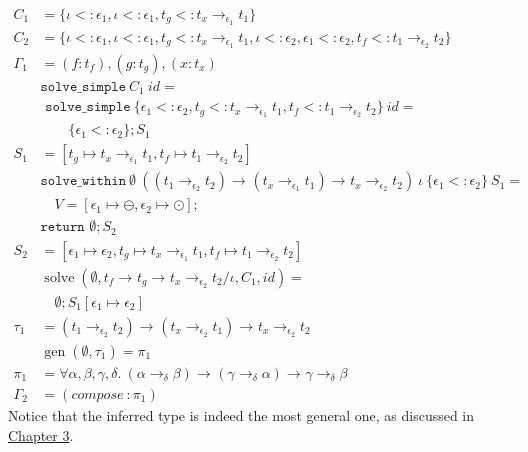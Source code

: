 \documentclass[declaration,shortabstract]{iithesis}
\theoremstyle{definition} \newtheorem{definition}{Definition}[section]
\newcommand{\arrow}[3]{{#1}\rightarrow_{#2}{#3}}
\begin{document}
\begin{align*}
C_1 & = \{\iota <: \epsilon_1, \iota <: \epsilon_1, t_g <: \arrow{t_x}{\epsilon_1}{t_1}\}
\\
C_2 & = \{
            \iota <: \epsilon_1, \iota <: \epsilon_1, t_g <: \arrow{t_x}{\epsilon_1}{t_1}, 
            \iota <: \epsilon_2, \epsilon_1 <: \epsilon_2, t_f <: \arrow{t_1}{\epsilon_2}{t_2}
        \}
\\
\Gamma_1 & = (f:t_f),(g:t_g),(x:t_x)
\\
  & \texttt{solve\_simple}\  C_1\ id = \\
  & \texttt{  solve\_simple}\ \{
            \epsilon_1 <: \epsilon_2,
           t_g <: \arrow{t_x}{\epsilon_1}{t_1}, 
           t_f <: \arrow{t_1}{\epsilon_2}{t_2}
        \}\ id = \\
  & \qquad \{\epsilon_1 <: \epsilon_2\} ; S_1\\
S_1 & = [t_g \mapsto \arrow{t_x}{\epsilon_1}{t_1}, t_f \mapsto \arrow{t_1}{\epsilon_2}{t_2}]
\\
  & \texttt{solve\_within}\ \emptyset\
    (\arrow{(\arrow{t_1}{\epsilon_2}{t_2})}{}{\arrow{(\arrow{t_x}{\epsilon_1}{t_1})}{}{\arrow{t_x}{\epsilon_2}{t_2}}})
    \ \iota \ \{\epsilon_1 <: \epsilon_2\} \ S_1 = \\
  & \quad V = [\epsilon_1 \mapsto \ominus, \epsilon_2 \mapsto \odot] ;\\
  & \texttt{return } \emptyset ; S_2
\\
S_2 & = [\epsilon_1 \mapsto \epsilon_2, t_g \mapsto \arrow{t_x}{\epsilon_1}{t_1}, t_f \mapsto \arrow{t_1}{\epsilon_2}{t_2}]
\\
& \operatorname{solve}(\emptyset, {\arrow{t_f}{}{\arrow{t_g}{}{\arrow{t_x}{\epsilon_2}{t_2}}}}/{\iota}, C_1, id) =
\\
& \quad \emptyset ; S_1[\epsilon_1 \mapsto \epsilon_2]
\\
\tau_1 & = \arrow{(\arrow{t_1}{\epsilon_2}{t_2})}{}{\arrow{(\arrow{t_x}{\epsilon_2}{t_1})}{}{\arrow{t_x}{\epsilon_2}{t_2}}} \\
& \operatorname{gen}(\emptyset, \tau_1) = \pi_1 \\
\pi_1 & =  \forall \alpha, \beta, \gamma, \delta .\ 
\arrow{(\arrow{\alpha}{\delta}{\beta})}{}{\arrow{(\arrow{\gamma}{\delta}{\alpha})}{}{\arrow{\gamma}{\delta}{\beta}
}}\\
\Gamma_2 & = (compose\ : \pi_1) 
\end{align*}
Notice that the inferred type is indeed the most general one, as discussed in \hyperlink{section.3.2}{Chapter 3}.
\end{document}
